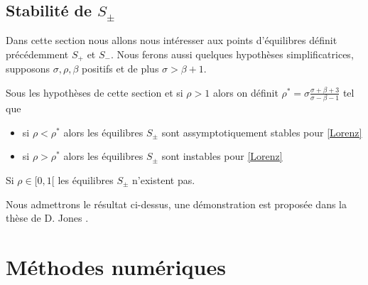 \documentclass{article}
\newtheorem[M , nocut]{prop}{Proposition}[section]
\newtheorem[M , nocut]{definition}{Définition}
\newtheorem[M , nocut]{lemme}{Lemme}
\newtheorem[L , nocut]{thm}{Théoreme}
\newtheorem[M , nocut]{cor}{Corollaire}
\begin{document}
\subsection{Stabilité de $S_\pm$}

Dans cette section nous allons nous intéresser aux points d'équilibres définit précédemment $S_+$ et $S_-$. Nous ferons aussi quelques hypothèses simplificatrices, supposons $\sigma,\rho,\beta$ positifs et de plus $\sigma>\beta+1$.

\begin{prop}
    Sous les hypothèses de cette section et si $\rho > 1$ alors on définit $\rho^* = \sigma \frac{\sigma+\beta+3}{\sigma-\beta-1}$ tel que 
    \begin{itemize}
        \item si $\rho < \rho^* $ alors les équilibres $S_\pm$ sont assymptotiquement stables pour \eqref{Lorenz}
        \item si $\rho > \rho^* $ alors les équilibres $S_\pm$ sont instables pour \eqref{Lorenz}
    \end{itemize}
\end{prop}

\begin{example}[Remarque]
    Si $\rho \in [0,1[$ les équilibres $S_\pm$ n'existent pas.
\end{example}

Nous admettrons le résultat ci-dessus, une démonstration est proposée dans la thèse de D. Jones \cite{daniel_jones_stability_2009}.

\newpage
\section{Méthodes numériques}
\end{document}

